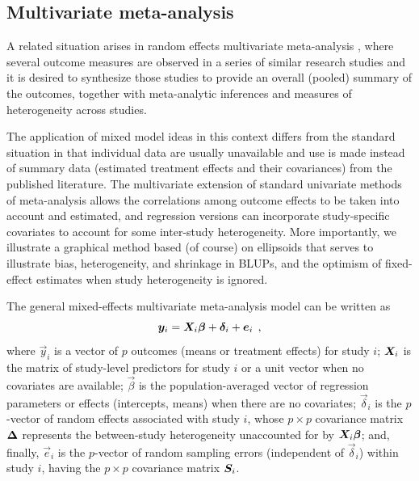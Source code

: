 \subsection{Multivariate meta-analysis}
A related situation arises in random effects multivariate
meta-analysis
\citep{Berkey-etal:1998,Nam-etal:2003},
where several outcome measures are observed in a series of
similar research studies and it is desired to synthesize
those studies to provide an overall (pooled) summary of the outcomes,
together with meta-analytic inferences and
measures of heterogeneity across studies.

The application of mixed model ideas in this context differs
from the standard situation in that individual data are
usually unavailable and use is made instead of
summary data (estimated treatment effects and their covariances)
from the published literature. The multivariate extension of standard
univariate methods of meta-analysis allows the correlations among
outcome effects to be taken into account and estimated, and
regression versions can incorporate study-specific covariates to
account for some inter-study heterogeneity. More importantly,
we illustrate a graphical method based (of course) on ellipsoids
that serves to illustrate bias, heterogeneity, and shrinkage in BLUPs,
and the optimism of fixed-effect estimates when
study heterogeneity is ignored.

The general mixed-effects multivariate meta-analysis model can be
written as
\begin{equation}\label{eq:mvmeta1}
	\bm{y}_i = \bm{X}_i \bm{\beta} + \bm{\delta}_i + \bm{e}_i \:\: ,
\end{equation}
where $\vec{y}_i$ is a vector of $p$ outcomes (means or treatment effects)
for study $i$; $\bm{X}_i$ is the matrix of study-level predictors
for study $i$ or a unit vector when no covariates are available;
$\vec{\beta}$ is the population-averaged vector of regression parameters
or effects (intercepts, means) when there are no covariates;
$\vec{\delta}_i$ is the $p$-vector of random effects associated with study $i$,
whose $p\times p$ covariance matrix $\bm{\Delta}$ represents the between-study
heterogeneity unaccounted for by $\bm{X}_i \bm{\beta}$; and,
finally, $\vec{e}_i$ is the $p$-vector of random sampling errors
(independent of $\vec{\delta}_i$)
within study $i$, having the $p\times p$ covariance matrix $\bm{S}_i$.

